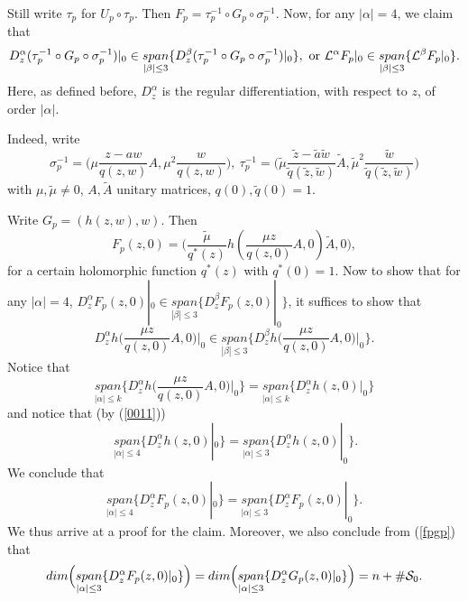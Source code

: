 \documentclass[12pt]{article}
\numberwithin{equation}{section}
\def\a{\alpha}
\def\w{\widetilde}
\def\a{\alpha}
\def\a{\alpha}
\def\a{\alpha}
\def\a{\alpha}
\begin{document}
 Still write $\tau_p$ for $U_p\circ \tau_p$. Then
$F_p=\tau_p^{-1}\circ G_p \circ \sigma_p^{-1}$. Now, for any
$|\alpha|=4$, we claim  that
\begin{equation}
\label{(5)} {D}_z^\alpha(\tau_p^{-1}\circ G_p \circ
\sigma_p^{-1})|_0 \in \underset{|\beta|\le 3}{span} \{
{D}_z^\beta(\tau_p^{-1}\circ G_p\circ \sigma_p^{-1})|_0\}, \
\hbox{or}\  {\cal L}^\alpha F_p|_0 \in \underset{|\beta|\le 3}{span}
\{ {\cal L}^\beta F_p|_0\}.
\end{equation}
Here, as defined before, $D_z^\alpha$ is the regular
differentiation, with respect to $z$, of order $|\alpha|$.


Indeed, write
$$
\sigma_p^{-1}=\Big(\mu
\frac{z-aw}{q(z,w)}A,\mu^2\frac{w}{q(z,w)}\Big),\
\tau_p^{-1}=\Big(\w{\mu}
\frac{\w{z}-\w{a}\w{w}}{\w{q}(\w{z},\w{w})}\w{A},\w{\mu}^2\frac{\w{w}}{\w{q}(\w{z},\w{w})}\Big)
$$
with $\mu,\w{\mu}\neq 0$, $A,\w{A}$ unitary matrices,
$q(0),\w{q}(0)=1$.

Write $G_p=(h(z,w),w)$. Then
\begin{equation}\label{fpgp}
F_p(z,0)=\big(\frac{\w{\mu}}{{q^*}(z)}h(\frac{\mu
z}{q(z,0)}A,0)\w{A},0\big),
\end{equation}
for a certain holomorphic
function $q^*(z)$ with $q^*(0)=1$. Now to show that for any
$|\a|=4$, $D^\a_zF_p(z,0)|_0\in \underset{|\beta|\le
3}{span}\{D_z^\beta F_p(z,0)|_0\}$, it suffices to show that
$$
D^\a_z h\big(\frac{\mu z}{q(z,0)}A,0\big)\big|_0\in
\underset{|\beta|\le 3}{span}\big\{D_z^\beta h\big(\frac{\mu
z}{q(z,0)}A,0\big)\big|_0\big\}.
$$
Notice that
$$
\underset{|\a|\leq k}{span}\big\{D^\a_z h\big(\frac{\mu
z}{q(z,0)}A,0\big)\big|_0 \big\}=\underset{|\a|\leq
k}{span}\big\{D^\a_z h(z,0)\big|_0 \big\}
$$
and notice that (by (\ref{0011})) $$\
\underset{|\a|\leq 4}{span}\{D^\a_z h( z,0)|_0 \}=\underset{|\a|\leq
3}{span}\{D^\a_z h(z,0)|_0 \}.
$$ We conclude that $$\underset{|\a|\leq 4}{span}\{D^\a_z F_p(z,0)|_0
\}=\underset{|\a|\leq 3}{span}\{D^\a_z F_p(z,0)|_0 \}.$$ We thus
arrive at a  proof for  the claim. Moreover, we also conclude from
(\ref{fpgp}) that
$$dim\Big(\underset{|\a|\leq 3}{span}\{D^\a_z
F_p(z,0)|_0\}\Big)=dim\Big(\underset{|\a|\leq 3}{span}\{D^\a_z
G_p(z,0)|_0\}\Big)=n+\# {\cal S}_0.$$








\medskip
\end{document}

